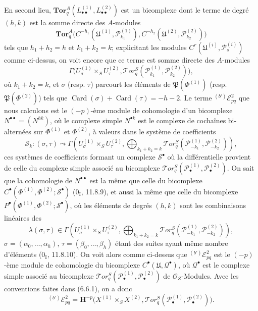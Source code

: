 \begin{env}[6.6.4]
En second lieu,
$\mathbf{Tor}_q^A(L_{\bullet\bullet}^{(1)},L_{\bullet\bullet}^{(2)})$ est un
bicomplexe dont le terme de degré $(h,k)$ est la somme directe des $A$-modules
\[
  \mathbf{Tor}_q^A
  \bigl(C^{-h_1}(\mathfrak U^{(1)},\mathscr P_{k_1}^{(1)}),
        C^{-h_2}(\mathfrak U^{(2)},\mathscr P_{k_2}^{(2)})\bigr)
\]
tels que $h_1+h_2=h$ et $k_1+k_2=k$; explicitant les modules
$C^r(\mathfrak U^{(i)},\mathscr P_s^{(i)})$ comme ci-dessus, on voit encore
que ce terme est somme directe des $A$-modules
\[
  \Gamma\bigl(U_\sigma^{(1)}\times_S U_\tau^{(2)},
    \mathscr{T}\!or_q^S
    (\mathscr P_{k_1}^{(1)},\mathscr P_{k_2}^{(2)})\bigr),
\]
où $k_1+k_2=k$, et $\sigma$ (resp. $\tau$) parcourt les éléments de
$\mathfrak P(\Phi^{(1)})$ (resp. $\mathfrak P(\Phi^{(2)})$) tels que
$\operatorname{Card}(\sigma)+\operatorname{Card}(\tau)=-h-2$. Le terme
${}^{(b')}\mathscr E_{pq}^2$ que nous calculons est le $(-p)$-ème module de
cohomologie d'un bicomplexe $N^{\bullet\bullet}=(N^{hk})$, où le complexe
simple $N^{\bullet k}$ est le complexe de cochaînes bi-alternées sur
$\Phi^{(1)}$ et $\Phi^{(2)}$, à valeurs dans le système de coefficients
\[
  \mathscr S_k:(\sigma,\tau)\leadsto
  \Gamma\left(U_\sigma^{(1)}\times_S U_\tau^{(2)},
    \bigoplus_{k_1+k_2=k}
    \mathscr{T}\!or_q^S
    (\mathscr P_{-k_1}^{(1)},\mathscr P_{-k_2}^{(2)})\right),
\]
ces systèmes de coefficients formant un complexe $\mathscr S^\bullet$ où la
différentielle provient de celle du complexe simple associé au bicomplexe
$\mathscr{T}\!or_q^S
(\mathscr P_\bullet^{(1)},\mathscr P_\bullet^{(2)})$. On sait que la
cohomologie de $N^{\bullet\bullet}$ est la même que celle du bicomplexe
$C^\bullet(\Phi^{(1)},\Phi^{(2)};\mathscr S^\bullet)$
($0_{\mathrm I}$, 11.8.9), et aussi la même que celle du bicomplexe
$P^\bullet(\Phi^{(1)},\Phi^{(2)};\mathscr S^\bullet)$, où les éléments de
degrés $(h,k)$ sont les combinaisons linéaires des
\[
  \lambda(\sigma,\tau)\in
  \Gamma\left(U_\sigma^{(1)}\times_S U_\tau^{(2)},
    \bigoplus_{k_1+k_2=k}
    \mathscr{T}\!or_q^S
    (\mathscr P_{-k_1}^{(1)},\mathscr P_{-k_2}^{(2)})\right),
\]
$\sigma=(\alpha_0,\ldots,\alpha_h)$,
$\tau=(\beta_0,\ldots,\beta_h)$ étant des suites ayant même nombre
d'éléments ($0_{\mathrm I}$, 11.8.10). On voit alors comme ci-dessus que
${}^{(b')}\mathscr E_{pq}^2$ est le $(-p)$-ème module de cohomologie du
bicomplexe $C^\bullet(\mathfrak U,\mathscr Q^\bullet)$, où
$\mathscr Q^\bullet$ est le complexe simple associé au bicomplexe
$\mathscr{T}\!or_q^S
(\mathscr P_\bullet^{(1)},\mathscr P_\bullet^{(2)})$ de
$\mathscr O_Z$-Modules. Avec les conventions faites dans (6.6.1), on a donc
\[
  {}^{(b')}\mathscr E_{pq}^2
  =\mathbf H^{-p}\bigl(X^{(1)}\times_S X^{(2)},
    \mathscr{T}\!or_q^S
    (\mathscr P_\bullet^{(1)},\mathscr P_\bullet^{(2)})\bigr).
\]
\end{env}

